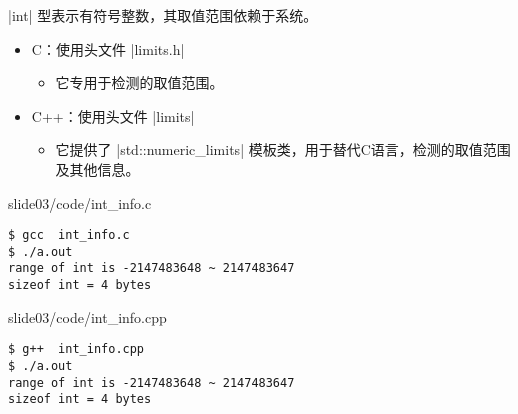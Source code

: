 \begin{frame}[fragile]
  \lst|int| 型表示有符号整数，其取值范围依赖于系统。
  \begin{itemize}
  \item C：使用头文件 \lst|limits.h|
    \begin{itemize}
    \item 它专用于检测的取值范围。
    \end{itemize}
  \item C++：使用头文件 \lst|limits|
    \begin{itemize}
    \item 它提供了 \lst|std::numeric_limits| 模板类，用于替代C语言，检测的取值范围及其他信息。
    \end{itemize}
  \end{itemize}
\end{frame}
%
\begin{frame}[fragile]
  
  {slide03/code/int_info.c}
\pause 
\begin{lstlisting}[backgroundcolor=\color{red!10}]
$ gcc  int_info.c
$ ./a.out
range of int is -2147483648 ~ 2147483647
sizeof int = 4 bytes
\end{lstlisting}
\end{frame}

\begin{frame}[fragile]
  
  {slide03/code/int_info.cpp}
\pause 
\begin{lstlisting}[backgroundcolor=\color{red!10}]
$ g++  int_info.cpp
$ ./a.out
range of int is -2147483648 ~ 2147483647
sizeof int = 4 bytes
\end{lstlisting}
\end{frame}


